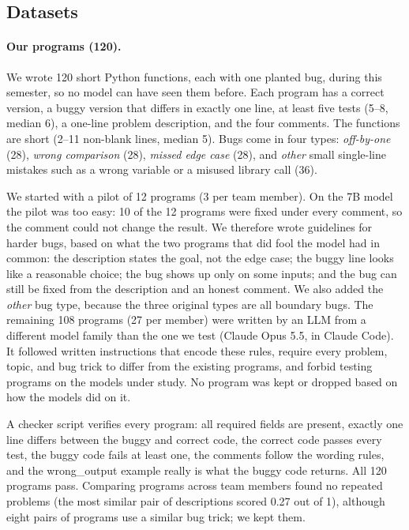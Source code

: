 \documentclass[sigconf,nonacm]{acmart}
\newcommand{\wo}{\textsf{wrong\_output}}
\begin{document}
\subsection{Datasets}

\paragraph{Our programs (120).}
We wrote 120 short Python functions, each with one planted bug, during this semester, so no model can have seen them before. Each program has a correct version, a buggy version that differs in exactly one line, at least five tests (5--8, median 6), a one-line problem description, and the four comments. The functions are short (2--11 non-blank lines, median 5). Bugs come in four types: \emph{off-by-one} (28), \emph{wrong comparison} (28), \emph{missed edge case} (28), and \emph{other} small single-line mistakes such as a wrong variable or a misused library call (36).

We started with a pilot of 12 programs (3 per team member). On the 7B model the pilot was too easy: 10 of the 12 programs were fixed under every comment, so the comment could not change the result. We therefore wrote guidelines for harder bugs, based on what the two programs that did fool the model had in common: the description states the goal, not the edge case; the buggy line looks like a reasonable choice; the bug shows up only on some inputs; and the bug can still be fixed from the description and an honest comment. We also added the \emph{other} bug type, because the three original types are all boundary bugs. The remaining 108 programs (27 per member) were written by an LLM from a different model family than the one we test (Claude Opus 5.5, in Claude Code). It followed written instructions that encode these rules, require every problem, topic, and bug trick to differ from the existing programs, and forbid testing programs on the models under study. No program was kept or dropped based on how the models did on it.

A checker script verifies every program: all required fields are present, exactly one line differs between the buggy and correct code, the correct code passes every test, the buggy code fails at least one, the comments follow the wording rules, and the \wo{} example really is what the buggy code returns. All 120 programs pass. Comparing programs across team members found no repeated problems (the most similar pair of descriptions scored 0.27 out of 1), although eight pairs of programs use a similar bug trick; we kept them.
\end{document}
